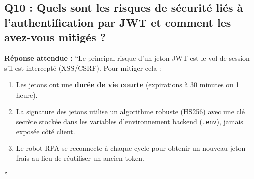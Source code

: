 \documentclass[11pt,a4paper]{article}
\begin{document}
\subsection*{Q10 : Quels sont les risques de sécurité liés à l'authentification par JWT et comment les avez-vous mitigés ?}
\begin{responsebox}
\textbf{Réponse attendue :} ``Le principal risque d'un jeton JWT est le vol de session s'il est intercepté (XSS/CSRF). Pour mitiger cela :
\begin{enumerate}
    \item Les jetons ont une \textbf{durée de vie courte} (expirations à 30 minutes ou 1 heure).
    \item La signature des jetons utilise un algorithme robuste (HS256) avec une clé secrète stockée dans les variables d'environnement backend (\texttt{.env}), jamais exposée côté client.
    \item Le robot RPA se reconnecte à chaque cycle pour obtenir un nouveau jeton frais au lieu de réutiliser un ancien token.
\end{enumerate}''
\end{responsebox}
\end{document}
